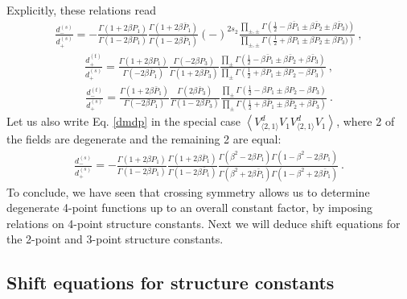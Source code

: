 \documentclass[12pt, a4paper]{article}
\theoremstyle{break}
\begin{document}
Explicitly, these relations read 
\begin{align}
  \frac{d^{(s)}_-}{d^{(s)}_+} = -\frac{\Gamma(1+2\beta P_1)}{\Gamma(1-2\beta P_1)}\frac{\Gamma(1+2\beta\bar P_1)}{\Gamma(1-2\beta\bar P_1)} (-)^{2s_2}
 \frac{\prod_{\pm,\pm}\Gamma\left(\tfrac12 -\beta\bar P_1\pm\beta \bar P_2\pm\beta \bar P_3)\right)}{\prod_{\pm,\pm}
 \Gamma\left(\tfrac12 +\beta P_1\pm \beta P_2\pm\beta P_3)\right)}\  ,
 \label{dmdp}
\end{align}
\begin{align}
 \frac{d^{(t)}_+}{d^{(s)}_+} = \frac{\Gamma\left(1+2\beta P_1\right)}{\Gamma\left(-2\beta\bar P_1\right)} 
 \frac{\Gamma\left(-2\beta P_3\right)}{\Gamma\left(1+2\beta\bar P_3\right)} 
  \frac{\prod_\pm\Gamma\left(\frac12 -\beta\bar P_1 \pm \beta\bar P_2 +\beta\bar P_3\right)}{\prod_\pm\Gamma\left(\frac12+\beta P_1 \pm \beta P_2 -\beta P_3\right)}\ ,
 \label{dpdp}
\end{align}
\begin{align}
 \frac{d^{(t)}_-}{d^{(s)}_+} = \frac{\Gamma\left(1+2\beta \bar P_1\right)}{\Gamma\left(-2\beta P_1\right)} 
 \frac{\Gamma\left(2\beta \bar P_3\right)}{\Gamma\left(1-2\beta P_3\right)} 
  \frac{\prod_\pm\Gamma\left(\frac12 -\beta P_1 \pm \beta P_2 -\beta P_3\right)}{\prod_\pm\Gamma\left(\frac12+\beta \bar P_1 \pm \beta \bar P_2 +\beta \bar P_3\right)}\ .
 \label{dtdp}
\end{align}
Let us also write Eq. \eqref{dmdp} in the special case $\left<V_{\langle 2,1\rangle}^d V_1V_{\langle 2,1\rangle}^d V_1\right>$, where 2 of the fields are degenerate and the remaining 2 are equal:
\begin{align}
\frac{d^{(s)}_-}{d^{(s)}_+} =
-\frac{\Gamma\left(1+2\beta P_1\right)}{\Gamma\left(1-2\beta P_1\right)} \frac{\Gamma\left(1+2\beta \bar P_1\right)}{\Gamma\left(1-2\beta \bar P_1\right)} 
 \frac{\Gamma\left(\beta^2-2\beta P_1\right)\Gamma\left(1-\beta^2-2\beta P_1\right)}{\Gamma\left(\beta^2+2\beta \bar P_1\right)\Gamma\left(1-\beta^2+2\beta \bar P_1\right)}\ .
 \label{ddb}
\end{align}
To conclude, we have seen that crossing symmetry allows us to determine degenerate 4-point functions up to an overall constant factor, by imposing relations on 4-point structure constants. Next we will deduce shift equations for the 2-point and 3-point structure constants. 


\subsection{Shift equations for structure constants}
\end{document}
